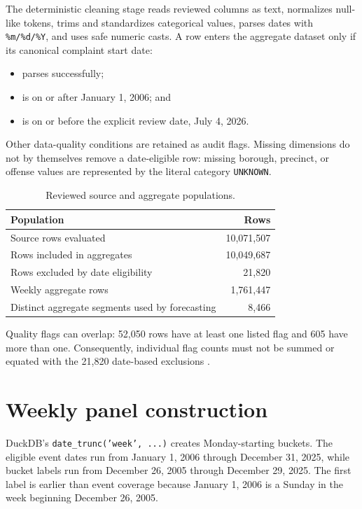 \documentclass[11pt,oneside]{report}
\begin{document}
The deterministic cleaning stage reads reviewed columns as text, normalizes
null-like tokens, trims and standardizes categorical values, parses dates with
\texttt{\%m/\%d/\%Y}, and uses safe numeric casts. A row enters the aggregate
dataset only if its canonical complaint start date:

\begin{itemize}
  \item parses successfully;
  \item is on or after January 1, 2006; and
  \item is on or before the explicit review date, July 4, 2026.
\end{itemize}

Other data-quality conditions are retained as audit flags. Missing dimensions
do not by themselves remove a date-eligible row: missing borough, precinct, or
offense values are represented by the literal category \texttt{UNKNOWN}.

\begin{table}[htbp]
  \centering
  \caption{Reviewed source and aggregate populations.}
  \label{tab:data-populations}
  \begin{tabularx}{0.83\textwidth}{Y r}
    \toprule
    Population & \textbf{Rows} \\
    \midrule
    Source rows evaluated & 10,071,507 \\
    Rows included in aggregates & 10,049,687 \\
    Rows excluded by date eligibility & 21,820 \\
    Weekly aggregate rows & 1,761,447 \\
    Distinct aggregate segments used by forecasting & 8,466 \\
    \bottomrule
  \end{tabularx}
\end{table}

Quality flags can overlap: 52,050 rows have at least one listed flag and 605
have more than one. Consequently, individual flag counts must not be summed or
equated with the 21,820 date-based exclusions \cite{qualityreport}.

\section{Weekly panel construction}

DuckDB's \texttt{date\_trunc('week', ...)} creates Monday-starting buckets. The
eligible event dates run from January 1, 2006 through December 31, 2025, while
bucket labels run from December 26, 2005 through December 29, 2025. The first
label is earlier than event coverage because January 1, 2006 is a Sunday in the
week beginning December 26, 2005.
\end{document}
